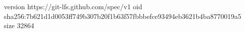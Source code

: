 version https://git-lfs.github.com/spec/v1
oid sha256:7b621d1d0053ff749b307b20f1b63f57fbbbefce93494eb3621b4ba8770019a5
size 32864
